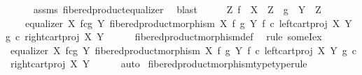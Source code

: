 \begin{isabellebody}
\ \ \ \ \isamarkupfalse%
\ assms\ fibered{\isacharunderscore}{\kern0pt}product{\isacharunderscore}{\kern0pt}equalizer\ \isamarkupfalse%
\ blast\isanewline
\ \ \isamarkupfalse%
\ \isamarkupfalse%
\ {\isachardoublequoteopen}{\isasymexists}Z{\isachardot}{\kern0pt}\ f\ {\isacharcolon}{\kern0pt}\ X\ {\isasymrightarrow}\ Z\ {\isasymand}\ g\ {\isacharcolon}{\kern0pt}\ Y\ {\isasymrightarrow}\ Z\ {\isasymand}\isanewline
\ \ \ \ equalizer\ {\isacharparenleft}{\kern0pt}X\ \isactrlbsub f\isactrlesub {\isasymtimes}\isactrlsub c\isactrlbsub g\isactrlesub \ Y{\isacharparenright}{\kern0pt}\ {\isacharparenleft}{\kern0pt}fibered{\isacharunderscore}{\kern0pt}product{\isacharunderscore}{\kern0pt}morphism\ X\ f\ g\ Y{\isacharparenright}{\kern0pt}\ {\isacharparenleft}{\kern0pt}f\ {\isasymcirc}\isactrlsub c\ left{\isacharunderscore}{\kern0pt}cart{\isacharunderscore}{\kern0pt}proj\ X\ Y{\isacharparenright}{\kern0pt}\ {\isacharparenleft}{\kern0pt}g\ {\isasymcirc}\isactrlsub c\ right{\isacharunderscore}{\kern0pt}cart{\isacharunderscore}{\kern0pt}proj\ X\ Y{\isacharparenright}{\kern0pt}{\isachardoublequoteclose}\isanewline
\ \ \ \ \isamarkupfalse%
\ fibered{\isacharunderscore}{\kern0pt}product{\isacharunderscore}{\kern0pt}morphism{\isacharunderscore}{\kern0pt}def\ \isamarkupfalse%
\ {\isacharparenleft}{\kern0pt}rule\ someI{\isacharunderscore}{\kern0pt}ex{\isacharparenright}{\kern0pt}\isanewline
\ \ \isamarkupfalse%
\ \isamarkupfalse%
\ {\isachardoublequoteopen}equalizer\ {\isacharparenleft}{\kern0pt}X\ \isactrlbsub f\isactrlesub {\isasymtimes}\isactrlsub c\isactrlbsub g\isactrlesub \ Y{\isacharparenright}{\kern0pt}\ {\isacharparenleft}{\kern0pt}fibered{\isacharunderscore}{\kern0pt}product{\isacharunderscore}{\kern0pt}morphism\ X\ f\ g\ Y{\isacharparenright}{\kern0pt}\ {\isacharparenleft}{\kern0pt}f\ {\isasymcirc}\isactrlsub c\ left{\isacharunderscore}{\kern0pt}cart{\isacharunderscore}{\kern0pt}proj\ X\ Y{\isacharparenright}{\kern0pt}\ {\isacharparenleft}{\kern0pt}g\ {\isasymcirc}\isactrlsub c\ right{\isacharunderscore}{\kern0pt}cart{\isacharunderscore}{\kern0pt}proj\ X\ Y{\isacharparenright}{\kern0pt}{\isachardoublequoteclose}\isanewline
\ \ \ \ \isamarkupfalse%
\ auto\isanewline
{}\isamarkupfalse%
%
\endisatagproof
{\isafoldproof}%
%
\isadelimproof
\isanewline
%
\endisadelimproof
\isanewline
{}\isamarkupfalse%
\ fibered{\isacharunderscore}{\kern0pt}product{\isacharunderscore}{\kern0pt}morphism{\isacharunderscore}{\kern0pt}type{\isacharbrackleft}{\kern0pt}type{\isacharunderscore}{\kern0pt}rule{\isacharbrackright}{\kern0pt}{\isacharcolon}{\kern0pt}\isanewline

\end{isabellebody}
